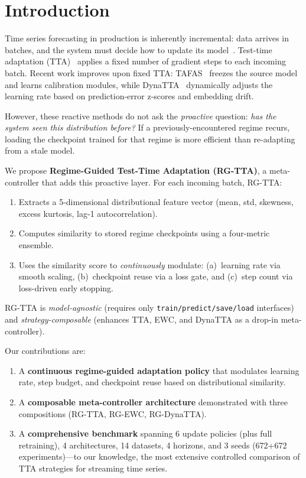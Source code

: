 \documentclass[journal]{IEEEtran}
\begin{document}
\section{Introduction}
\label{sec:intro}

Time series forecasting in production is inherently incremental: data arrives in batches, and the system must decide how to update its model~\cite{lim2021timeseries,benidis2023deep}. Test-time adaptation (TTA)~\cite{liang2024tta} applies a fixed number of gradient steps to each incoming batch. Recent work improves upon fixed TTA: TAFAS~\cite{kim2025tafas} freezes the source model and learns calibration modules, while DynaTTA~\cite{grover2025dynatta} dynamically adjusts the learning rate based on prediction-error z-scores and embedding drift.

However, these reactive methods do not ask the \emph{proactive} question: \textit{has the system seen this distribution before?} If a previously-encountered regime recurs, loading the checkpoint trained for that regime is more efficient than re-adapting from a stale model.

We propose \textbf{Regime-Guided Test-Time Adaptation (RG-TTA)}, a meta-controller that adds this proactive layer. For each incoming batch, RG-TTA:
\begin{enumerate}[nosep]
  \item Extracts a 5-dimensional distributional feature vector (mean, std, skewness, excess kurtosis, lag-1 autocorrelation).
  \item Computes similarity to stored regime checkpoints using a four-metric ensemble.
  \item Uses the similarity score to \emph{continuously} modulate: (a)~learning rate via smooth scaling, (b)~checkpoint reuse via a loss gate, and (c)~step count via loss-driven early stopping.
\end{enumerate}

RG-TTA is \emph{model-agnostic} (requires only \texttt{train/predict/save/load} interfaces) and \emph{strategy-composable} (enhances TTA, EWC, and DynaTTA as a drop-in meta-controller).

Our contributions are:
\begin{enumerate}[nosep]
  \item A \textbf{continuous regime-guided adaptation policy} that modulates learning rate, step budget, and checkpoint reuse based on distributional similarity.
  \item A \textbf{composable meta-controller architecture} demonstrated with three compositions (RG-TTA, RG-EWC, RG-DynaTTA).
  \item A \textbf{comprehensive benchmark} spanning 6 update policies (plus full retraining), 4 architectures, 14 datasets, 4 horizons, and 3 seeds (672+672 experiments)---to our knowledge, the most extensive controlled comparison of TTA strategies for streaming time series.
\end{enumerate}
\end{document}
